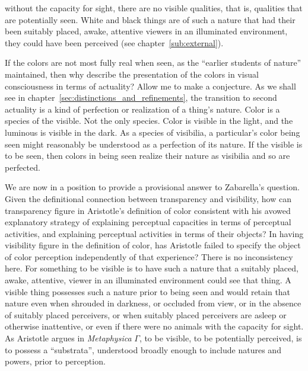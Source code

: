 without the capacity for sight, there are no visible qualities, that is, qualities that are potentially seen. White and black things are of such a nature that had their been suitably placed, awake, attentive viewers in an illuminated environment, they could have been perceived (see chapter~\ref{sub:external}).

If the colors are not most fully real when seen, as the ``earlier students of nature'' maintained, then why describe the presentation of the colors in visual consciousness in terms of actuality? Allow me to make a conjecture. As we shall see in chapter~\ref{sec:distinctions_and_refinements}, the transition to second actuality is a kind of perfection or realization of a thing's nature. Color is a species of the visible. Not the only species. Color is visible in the light, and the luminous is visible in the dark. As a species of visibilia, a particular's color being seen might reasonably be understood as a perfection of its nature. If the visible is to be seen, then colors in being seen realize their nature as visibilia and so are perfected.

We are now in a position to provide a provisional answer to Zabarella's question. Given the definitional connection between transparency and visibility, how can transparency figure in Aristotle's definition of color consistent with his avowed explanatory strategy of explaining perceptual capacities in terms of perceptual activities, and explaining perceptual activities in terms of their objects? In having visibility figure in the definition of color, has Aristotle failed to specify the object of color perception independently of that experience? There is no inconsistency here. For something to be visible is to have such a nature that a suitably placed, awake, attentive, viewer in an illuminated environment could see that thing. A visible thing possesses such a nature prior to being seen and would retain that nature even when shrouded in darkness, or occluded from view, or in the absence of suitably placed perceivers, or when suitably placed perceivers are asleep or otherwise inattentive, or even if there were no animals with the capacity for sight. As Aristotle argues in \emph{Metaphysica} \( \Gamma \), to be visible, to be potentially perceived, is to possess a ``substrata'', understood broadly enough to include natures and powers, prior to perception.

